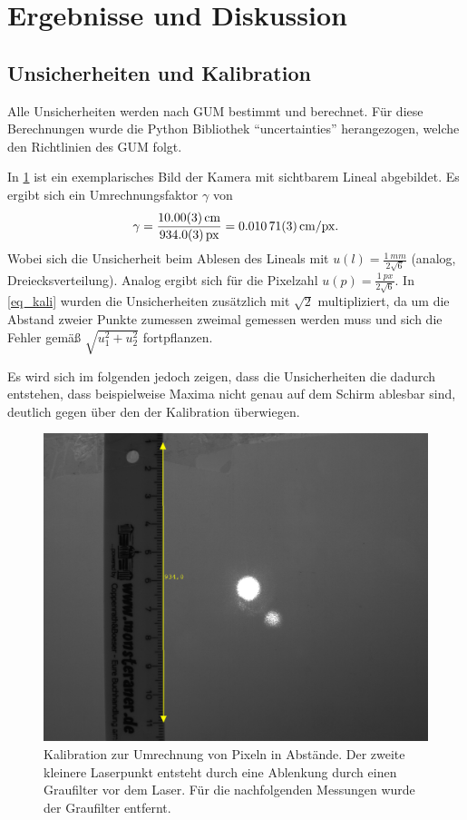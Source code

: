 \documentclass[
	a4paper,
	12pt,
	pagesize,
	ngerman
]{scrartcl}
\begin{document}
	\section{Ergebnisse und Diskussion}

	\subsection{Unsicherheiten und Kalibration}
	Alle Unsicherheiten werden nach GUM bestimmt und berechnet.
	Für diese Berechnungen wurde die Python Bibliothek \enquote{uncertainties} herangezogen, welche den Richtlinien des GUM folgt.

	In \cref{fig_kalibration} ist ein exemplarisches Bild der Kamera mit sichtbarem Lineal abgebildet.
	Es ergibt sich ein Umrechnungsfaktor $\gamma$ von
	\begin{equation}
			\label{eq_kali}
			\gamma = \frac{\SI{10.0+-0.03}{cm}}{\SI{934+-0.3}{px}}=\SI{0.01071+-0.00003}{cm/px}.
	\end{equation}
	Wobei sich die Unsicherheit beim Ablesen des Lineals mit $u(l)=\frac{\SI{1}{mm}}{2\sqrt{6}}$ (analog, Dreiecksverteilung).
	Analog ergibt sich für die Pixelzahl $u(p)=\frac{\SI{1}{px}}{2\sqrt{6}}$.
	In \cref{eq_kali} wurden die Unsicherheiten zusätzlich mit $\sqrt{2}$ multipliziert, da um die Abstand zweier Punkte zumessen zweimal gemessen werden muss und sich die Fehler gemäß $\sqrt{u_1^2+u_2^2}$ fortpflanzen.

	Es wird sich im folgenden jedoch zeigen, dass die Unsicherheiten die dadurch entstehen, dass beispielweise Maxima nicht genau auf dem Schirm ablesbar sind, deutlich gegen über den der Kalibration überwiegen. %


	\begin{figure}[H]
		\includegraphics[width=0.7\linewidth]{raw/0/0_kalibration.png}
					\caption{
						Kalibration zur Umrechnung von Pixeln in Abstände.
						Der zweite kleinere Laserpunkt entsteht durch eine Ablenkung durch einen Graufilter vor dem Laser.
						Für die nachfolgenden Messungen wurde der Graufilter entfernt.
					}
					\label{fig_kalibration}
			\end{figure}
\end{document}
